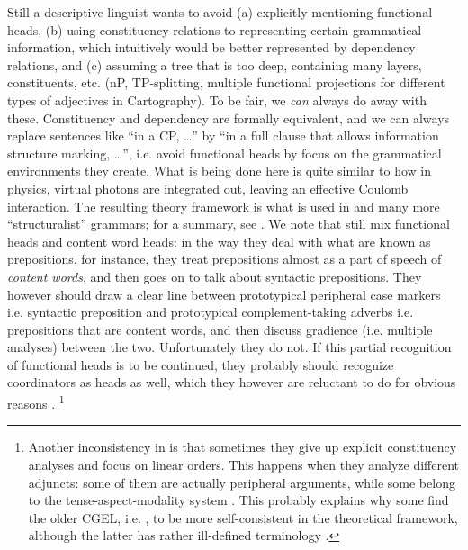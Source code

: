 \documentclass[a4paper, oneside, scheme=plain, 12pt]{article}
\begin{document}
Still a descriptive linguist wants to avoid 
(a) explicitly mentioning functional heads,
(b) using constituency relations to representing certain grammatical information, which intuitively would be better represented by dependency relations, and 
(c) assuming a tree that is too deep, containing many layers, constituents, etc. (nP, TP-splitting, multiple functional projections for different types of adjectives in Cartography).
To be fair, we \emph{can} always do away with these.
Constituency and dependency are formally equivalent,
and we can always replace sentences like ``in a CP, \dots''
by ``in a full clause that allows information structure marking, \dots'',
i.e. avoid functional heads by focus on the grammatical environments they create.
What is being done here is quite similar to how in physics,
virtual photons are integrated out, leaving an effective Coulomb interaction.
The resulting theory framework is what is used in \citet{cgel} and many more ``structuralist'' grammars;
for a summary, see \citet{reynolds2023unified}.
We note that \citet{cgel} still mix functional heads and content word heads:
in the way they deal with what are known as prepositions, for instance,
they treat prepositions almost as a part of speech of \emph{content words},
and then goes on to talk about syntactic prepositions.
They however should draw a clear line between prototypical peripheral case markers
i.e. syntactic preposition
and prototypical complement-taking adverbs i.e. prepositions that are content words,
and then discuss gradience (i.e. multiple analyses) between the two.
Unfortunately they do not.
If this partial recognition of functional heads is to be continued,
they probably should recognize coordinators as heads as well,
which they however are reluctant to do for obvious reasons \citep{reynolds2023unified}.%
\footnote{
    Another inconsistency in \citet{cgel} is that sometimes they give up explicit constituency analyses
    and focus on linear orders. This happens when they analyze different adjuncts:
    some of them are actually peripheral arguments,
    while some belong to the tense-aspect-modality system \citep{cinque1999adverbs}.
    This probably explains why some find the older CGEL, i.e. \citet{quirk2010comprehensive},
    to be more self-consistent in the theoretical framework,
    although the latter has rather ill-defined terminology \citep{huddleston1988comprehensive}.
}
\end{document}

